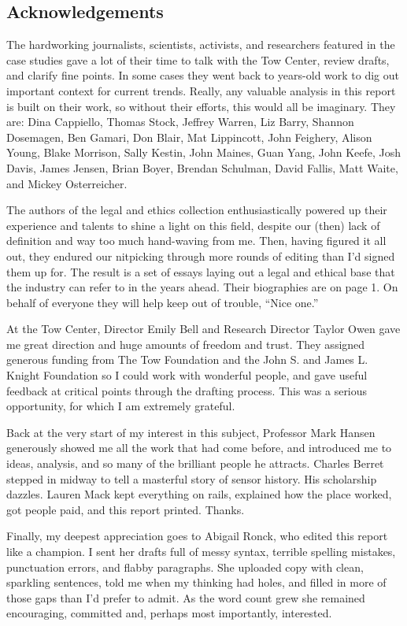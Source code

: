 \begin{itemize}
\begin{itemized}
\begin{itemize}
\chapter{Acknowledgements}
The hardworking journalists, scientists, activists, and researchers featured in the
case studies gave a lot of their time to talk with the Tow Center, review drafts, and
clarify fine points. In some cases they went back to years-old work to dig out important
context for current trends. Really, any valuable analysis in this report is built on
their work, so without their efforts, this would all be imaginary. They are: Dina Cappiello,
Thomas Stock, Jeffrey Warren, Liz Barry, Shannon Dosemagen, Ben Gamari,
Don Blair, Mat Lippincott, John Feighery, Alison Young, Blake Morrison, Sally Kestin,
John Maines, Guan Yang, John Keefe, Josh Davis, James Jensen, Brian Boyer,
Brendan Schulman, David Fallis, Matt Waite, and Mickey Osterreicher.

The authors of the legal and ethics collection enthusiastically powered up their experience
and talents to shine a light on this field, despite our (then) lack of definition
and way too much hand-waving from me. Then, having figured it all out, they
endured our nitpicking through more rounds of editing than I'd signed them up for.
The result is a set of essays laying out a legal and ethical base that the industry can
refer to in the years ahead. Their biographies are on page 1. On behalf of everyone
they will help keep out of trouble, ``Nice one.''

At the Tow Center, Director Emily Bell and Research Director Taylor Owen gave me
great direction and huge amounts of freedom and trust. They assigned generous funding
from The Tow Foundation and the John S. and James L. Knight Foundation so I
could work with wonderful people, and gave useful feedback at critical points through
the drafting process. This was a serious opportunity, for which I am extremely grateful.

Back at the very start of my interest in this subject, Professor Mark Hansen generously
showed me all the work that had come before, and introduced me to ideas,
analysis, and so many of the brilliant people he attracts. Charles Berret stepped in
midway to tell a masterful story of sensor history. His scholarship dazzles. Lauren
Mack kept everything on rails, explained how the place worked, got people paid, and
this report printed. Thanks.

Finally, my deepest appreciation goes to Abigail Ronck, who edited this report like a
champion. I sent her drafts full of messy syntax, terrible spelling mistakes, punctuation
errors, and flabby paragraphs. She uploaded copy with clean, sparkling sentences,
told me when my thinking had holes, and filled in more of those gaps than I'd
prefer to admit. As the word count grew she remained encouraging, committed and,
perhaps most importantly, interested.


\end{itemize}
\end{itemized}
\end{itemize}
